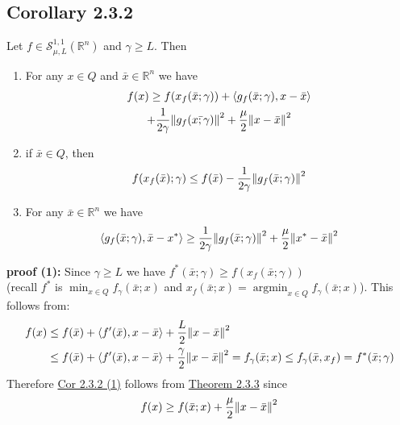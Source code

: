\documentclass[12pt,a4paper]{article}
\DeclareMathOperator*{\argmin}{argmin}
\begin{document}
	 \subsection*{Corollary 2.3.2}\label{cor232}
	 Let $f \in \mathcal{S}_{\mu,L}^{1,1}(\mathbb{R}^n)$ and $\gamma \geq L$. Then
	 \begin{enumerate}
	 	\item For any $x \in Q$ and $\bar{x} \in \mathbb{R}^n$ we have
	 	\begin{align}\label{cor232_1}
	 		\begin{gathered}
		 		f(x)  \geq f(x_f(\bar{x};\gamma)) + \langle g_f(\bar{x};\gamma), x - \bar{x} \rangle \\
		 		 +\frac{1}{2\gamma}\norm{g_f(\bar{x;\gamma})}^2 + \frac{\mu}{2}\norm{x - \bar{x}}^2
	 		\end{gathered}
	 	\end{align}
	 	\item if $\bar{x} \in Q$, then
	 	\begin{align}\label{cor232_2}
	 		f(x_f(\bar{x});\gamma) \leq f(\bar{x}) - \frac{1}{2\gamma}\norm{g_f(\bar{x};\gamma)}^2
	 	\end{align}
	 	\item For any $\bar{x} \in \mathbb{R}^n$ we have
	 	\begin{align}\label{cor232_3}
	 		\langle g_f(\bar{x};\gamma), \bar{x} - x^* \rangle \geq \frac{1}{2\gamma}\norm{g_f(\bar{x};\gamma)}^2 + \frac{\mu}{2}\norm{x^* - \bar{x}}^2
	 	\end{align}
	 \end{enumerate}
	 \textbf{proof (1):} Since $\gamma \geq L$ we have $f^*(\bar{x};\gamma) \geq f(x_f(\bar{x};\gamma))$ \\(recall $f^*$ is $\min_{x \in Q}f_{\gamma}(\bar{x};x)$ and $x_f(\bar{x};x) = \argmin_{x \in Q}f_{\gamma}(\bar{x};x)$). This follows from:
	 \begin{align*}
	 	f(x) &\leq f(\bar{x}) + \langle f'(\bar{x}), x - \bar{x} \rangle + \frac{L}{2}\norm{x - \bar{x}}^2 \\
	 	&\leq f(\bar{x}) + \langle f'(\bar{x}), x - \bar{x} \rangle + \frac{\gamma}{2}\norm{x - \bar{x}}^2 = f_{\gamma}(\bar{x};x) \leq f_{\gamma}(\bar{x},x_f) = f^*(\bar{x};\gamma)
	 \end{align*}
	 Therefore \hyperref[cor232_1]{Cor 2.3.2 (1)} follows from \hyperref[thm233]{Theorem 2.3.3} since
	 \begin{align*}
	 	f(x) \geq f(\bar{x};x) + \frac{\mu}{2}\norm{x - \bar{x}}^2
	 \end{align*}
\end{document}
